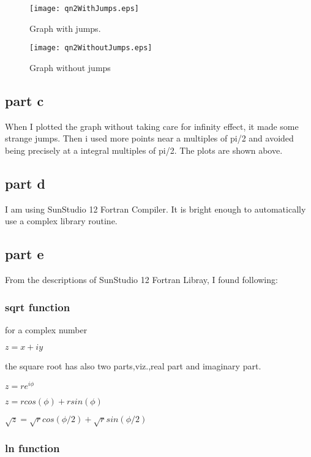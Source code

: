 \documentclass{article}
\begin{document}
\begin{figure}[ht!]
  \caption{Graph with jumps.}
  \centering
    \texttt{[image: qn2WithJumps.eps]}
\end{figure}

\begin{figure}[ht!]
  \caption{Graph without jumps}
  \centering
    \texttt{[image: qn2WithoutJumps.eps]}
\end{figure}

\subsection{part c}
When I plotted the graph without taking care for infinity effect, it made
some strange jumps. Then i used more points near  a multiples of pi/2 and
avoided being precisely at a integral multiples of pi/2.
The plots are shown above.

\subsection{part d}
I am using SunStudio 12 Fortran Compiler.
It is bright enough to automatically use a complex library routine.

\subsection{part e}
From the descriptions of SunStudio 12 Fortran Libray, I found following:

\subsubsection{ sqrt function}
for a complex number
 
$z = x + iy 
$ 

the square root has also two parts,viz.,real part and imaginary part.

$ z=re^{i \phi} $
    
$ z=r cos(\phi) + r sin(\phi) $

$    \sqrt{z} = \sqrt{r} cos(\phi/2) + \sqrt{r}  sin(\phi/2) $


\subsubsection{ ln function}
\end{document}
